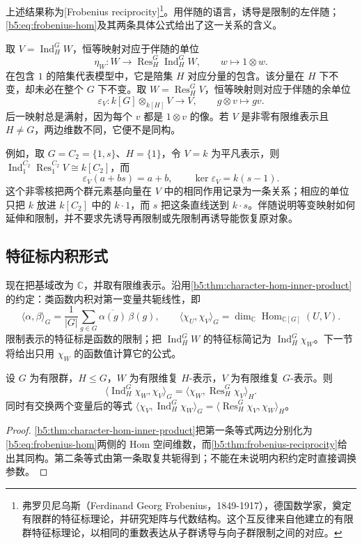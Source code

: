 上述结果称为[Frobenius reciprocity]\footnote{弗罗贝尼乌斯（Ferdinand Georg Frobenius，1849-1917），德国数学家，奠定有限群的特征标理论，并研究矩阵与代数结构。这个互反律来自他建立的有限群特征标理论，以相同的重数表达从子群诱导与向子群限制之间的对应。}。用伴随的语言，诱导是限制的左伴随；\eqref{b5:eq:frobenius-hom}及其两条具体公式给出了这一关系的含义。

\ProseParagraphBreak
取 \(V=\operatorname{Ind}_H^G W\)，恒等映射对应于伴随的单位
\[
	\eta_W:W\longrightarrow\operatorname{Res}_H^G\operatorname{Ind}_H^G W, \qquad w\longmapsto1\otimes w.
\]
在包含 \(1\) 的陪集代表模型中，它是陪集 \(H\) 对应分量的包含。该分量在 \(H\) 下不变，却未必在整个 \(G\) 下不变。取 \(W=\operatorname{Res}_H^G V\)，恒等映射则对应于伴随的余单位
\[
	\varepsilon_V:k[G]\otimes_{k[H]}V\longrightarrow V, \qquad g\otimes v\longmapsto gv.
\]
后一映射总是满射，因为每个 \(v\) 都是 \(1\otimes v\) 的像。若 \(V\) 是非零有限维表示且 \(H\ne G\)，两边维数不同，它便不是同构。

\ProseParagraphBreak
例如，取 \(G=C_2=\{1,s\}\)、\(H=\{1\}\)，令 \(V=k\) 为平凡表示，则 \(\operatorname{Ind}_1^{C_2}\operatorname{Res}_1^{C_2}V\cong k[C_2]\)，而
\[
	\varepsilon_V(a+bs)=a+b,\qquad \ker\varepsilon_V=k(s-1).
\]
这个非零核把两个群元素基向量在 \(V\) 中的相同作用记录为一条关系；相应的单位只把 \(k\) 放进 \(k[C_2]\) 中的 \(k\cdot1\)，而 \(s\) 把这条直线送到 \(k\cdot s\)。伴随说明等变映射如何延伸和限制，并不要求先诱导再限制或先限制再诱导能恢复原对象。

\subsection{特征标内积形式}
\label{b5:subsec:0302:02}

现在把基域改为 \(\mathbb C\)，并取有限维表示。沿用\cref{b5:thm:character-hom-inner-product}的约定：类函数内积对第一变量共轭线性，即
\[
	\langle\alpha,\beta\rangle_G =\frac1{|G|}\sum_{g\in G}\overline{\alpha(g)}\,\beta(g), \qquad \langle\chi_U,\chi_V\rangle_G =\dim_{\mathbb C}\operatorname{Hom}_{\mathbb C[G]}(U,V).
\]
限制表示的特征标是函数的限制；把 \(\operatorname{Ind}_H^G W\) 的特征标简记为 \(\operatorname{Ind}_H^G\chi_W\)。下一节将给出只用 \(\chi_W\) 的函数值计算它的公式。

\begin{corollary}\label{b5:cor:frobenius-character}
	设 \(G\) 为有限群，\(H\le G\)，\(W\) 为有限维复 \(H\)-表示，\(V\) 为有限维复 \(G\)-表示。则
	\begin{equation}\label{b5:eq:frobenius-character}
		\langle\operatorname{Ind}_H^G\chi_W,\chi_V\rangle_G =\langle\chi_W,\operatorname{Res}_H^G\chi_V\rangle_H.
	\end{equation}
	同时有交换两个变量后的等式 \(\langle\chi_V,\operatorname{Ind}_H^G\chi_W\rangle_G =\langle\operatorname{Res}_H^G\chi_V,\chi_W\rangle_H\)。
\end{corollary}
\begin{proof}
	\cref{b5:thm:character-hom-inner-product}把第一条等式两边分别化为\eqref{b5:eq:frobenius-hom}两侧的 Hom 空间维数，而\cref{b5:thm:frobenius-reciprocity}给出其同构。第二条等式由第一条取复共轭得到；不能在未说明内积约定时直接调换参数。
\end{proof}

